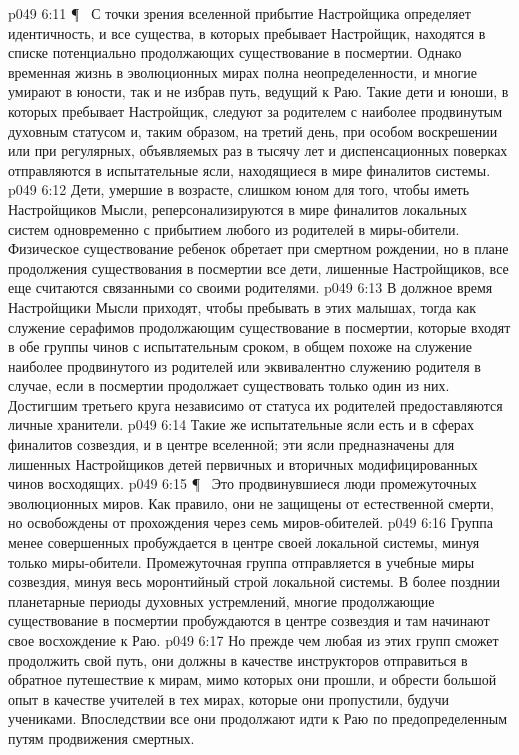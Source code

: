 \vs p049 6:11 \P\ \bibnobreakspace {} С точки зрения вселенной прибытие Настройщика определяет идентичность, и все существа, в которых пребывает Настройщик, находятся в списке потенциально продолжающих существование в посмертии. Однако временная жизнь в эволюционных мирах полна неопределенности, и многие умирают в юности, так и не избрав путь, ведущий к Раю. Такие дети и юноши, в которых пребывает Настройщик, следуют за родителем с наиболее продвинутым духовным статусом и, таким образом, на третий день, при особом воскрешении или при регулярных, объявляемых раз в тысячу лет и диспенсационных поверках отправляются в испытательные ясли, находящиеся в мире финалитов системы.
\vs p049 6:12 Дети, умершие в возрасте, слишком юном для того, чтобы иметь Настройщиков Мысли, реперсонализируются в мире финалитов локальных систем одновременно с прибытием любого из родителей в миры\hyp{}обители. Физическое существование ребенок обретает при смертном рождении, но в плане продолжения существования в посмертии все дети, лишенные Настройщиков, все еще считаются связанными со своими родителями.
\vs p049 6:13 В должное время Настройщики Мысли приходят, чтобы пребывать в этих малышах, тогда как служение серафимов продолжающим существование в посмертии, которые входят в обе группы чинов с испытательным сроком, в общем похоже на служение наиболее продвинутого из родителей или эквивалентно служению родителя в случае, если в посмертии продолжает существовать только один из них. Достигшим третьего круга независимо от статуса их родителей предоставляются личные хранители.
\vs p049 6:14 Такие же испытательные ясли есть и в сферах финалитов созвездия, и в центре вселенной; эти ясли предназначены для лишенных Настройщиков детей первичных и вторичных модифицированных чинов восходящих.
\vs p049 6:15 \P\ \bibnobreakspace {} Это продвинувшиеся люди промежуточных эволюционных миров. Как правило, они не защищены от естественной смерти, но освобождены от прохождения через семь миров\hyp{}обителей.
\vs p049 6:16 Группа менее совершенных пробуждается в центре своей локальной системы, минуя только миры\hyp{}обители. Промежуточная группа отправляется в учебные миры созвездия, минуя весь моронтийный строй локальной системы. В более позднии планетарные периоды духовных устремлений, многие продолжающие существование в посмертии пробуждаются в центре созвездия и там начинают свое восхождение к Раю.
\vs p049 6:17 Но прежде чем любая из этих групп сможет продолжить свой путь, они должны в качестве инструкторов отправиться в обратное путешествие к мирам, мимо которых они прошли, и обрести большой опыт в качестве учителей в тех мирах, которые они пропустили, будучи учениками. Впоследствии все они продолжают идти к Раю по предопределенным путям продвижения смертных.
